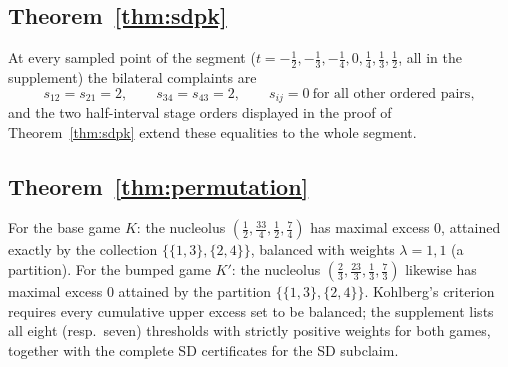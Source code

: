 \documentclass[11pt]{article}
\begin{document}
\subsection*{Theorem~\ref{thm:sdpk}}

At every sampled point of the segment ($t=-\tfrac12,-\tfrac13,-\tfrac14,
0,\tfrac14,\tfrac13,\tfrac12$, all in the supplement) the bilateral
complaints are
\[
s_{12}=s_{21}=2,\qquad s_{34}=s_{43}=2,\qquad
s_{ij}=0\ \text{for all other ordered pairs},
\]
and the two half-interval stage orders displayed in the proof of
Theorem~\ref{thm:sdpk} extend these equalities to the whole segment.

\subsection*{Theorem~\ref{thm:permutation}}

For the base game $K$: the nucleolus
$(\tfrac12,\tfrac{33}4,\tfrac12,\tfrac74)$ has maximal excess $0$, attained
exactly by the collection $\{\{1,3\},\{2,4\}\}$, balanced with weights
$\lambda=1,1$ (a partition). For the bumped game $K'$: the nucleolus
$(\tfrac23,\tfrac{23}3,\tfrac13,\tfrac73)$ likewise has maximal excess $0$
attained by the partition $\{\{1,3\},\{2,4\}\}$. Kohlberg's criterion
requires every cumulative upper excess set to be balanced; the supplement
lists all eight (resp.\ seven) thresholds with strictly positive weights for
both games, together with the complete SD certificates for the SD subclaim.
\end{document}
